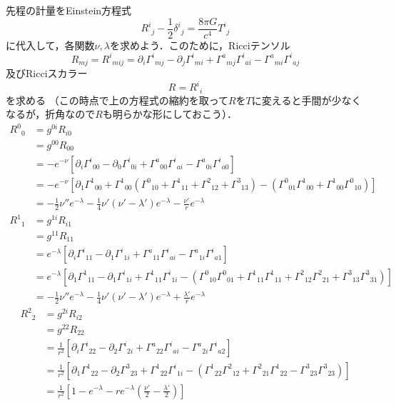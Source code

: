 \documentclass[a4paper]{ltjsreport}
\begin{document}
先程の計量をEinstein方程式
\[ {R^i}_j - \frac{1}{2}{\delta^i}_j=\frac{8\pi{}G}{c^4}{T^i}_j \]
に代入して，各関数$\nu, \lambda$を求めよう．このために，Ricciテンソル
\[R_{mj}={R^i}_{mij}=\partial_i{\Gamma^i}_{mj} - \partial_j{\Gamma^i}_{mi} + {\Gamma^a}_{mj}{\Gamma^i}_{ai} - {\Gamma^a}_{mi}{\Gamma^i}_{aj}\]
及びRicciスカラー
\[R={R^i}_{i}\]
を求める
（この時点で上の方程式の縮約を取って$R$を$T$に変えると手間が少なくなるが，折角なので$R$も明らかな形にしておこう）．
\begin{align*}
  {R^0}_0 &= g^{0i}R_{i0}\\
  &= g^{00}R_{00}\\
  &= -  e^{ - \nu}\left[\partial_i{\Gamma^i}_{00} - \partial_0{\Gamma^i}_{0i} + {\Gamma^a}_{00}{\Gamma^i}_{ai} - {\Gamma^a}_{0i}{\Gamma^i}_{a0}\right]\\
  &= -  e^{ - \nu}\left[\partial_1{\Gamma^1}_{00} + {\Gamma^1}_{00}\left({\Gamma^0}_{10} + {\Gamma^1}_{11} + {\Gamma^2}_{12} + {\Gamma^3}_{13}\right) - \left({\Gamma^0}_{01}{\Gamma^1}_{00} + {\Gamma^1}_{00}{\Gamma^0}_{10}\right)\right]\\
  &= -  \frac{1}{2}\nu''e^{ - \lambda} - \frac{1}{4}\nu'(\nu' - \lambda')e^{ - \lambda} - \frac{\nu'}{r}e^{ - \lambda}
\end{align*}
\begin{align*}
  {R^1}_1 &= g^{1i}R_{i1}\\
  &= g^{11}R_{11}\\
  &= e^{ - \lambda}\left[\partial_i{\Gamma^i}_{11} - \partial_1{\Gamma^i}_{1i} + {\Gamma^a}_{11}{\Gamma^i}_{ai} - {\Gamma^a}_{1i}{\Gamma^i}_{a1}\right]\\
  &= e^{ - \lambda}\left[\partial_1{\Gamma^1}_{11} - \partial_1{\Gamma^i}_{1i} + {\Gamma^1}_{11}{\Gamma^i}_{1i} - \left({\Gamma^0}_{10}{\Gamma^0}_{01} + {\Gamma^1}_{11}{\Gamma^1}_{11} + {\Gamma^2}_{12}{\Gamma^2}_{21} + {\Gamma^3}_{13}{\Gamma^3}_{31}\right)\right]\\
  &= -  \frac{1}{2}\nu''e^{ - \lambda} - \frac{1}{4}\nu'(\nu' - \lambda')e^{ - \lambda} + \frac{\lambda'}{r}e^{ - \lambda}
\end{align*}
\begin{align*}
  {R^2}_2 &= g^{2i}R_{i2}\\
  &= g^{22}R_{22}\\
  &= \frac{1}{r^2}\left[\partial_i{\Gamma^i}_{22} - \partial_2{\Gamma^i}_{2i} + {\Gamma^a}_{22}{\Gamma^i}_{ai} - {\Gamma^a}_{2i}{\Gamma^i}_{a2}\right]\\
  &= \frac{1}{r^2}\left[\partial_1{\Gamma^1}_{22} - \partial_2{\Gamma^3}_{23} + {\Gamma^1}_{22}{\Gamma^i}_{1i} - \left({\Gamma^1}_{22}{\Gamma^2}_{12} + {\Gamma^2}_{21}{\Gamma^1}_{22} - {\Gamma^3}_{23}{\Gamma^3}_{23}\right)\right]\\
  &= \frac{1}{r^2}\left[1 - e^{ - \lambda} - re^{ - \lambda}\left(\frac{\nu'}{2} - \frac{\lambda'}{2}\right)\right]
\end{align*}
\end{document}
